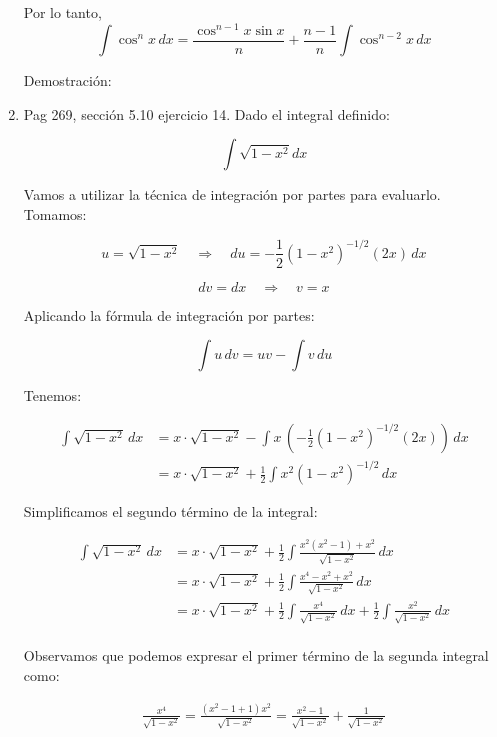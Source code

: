 \documentclass{report}
\begin{document}
\begin{enumerate}
        Por lo tanto,
        \[
        \int \cos^{n} x \, dx = \frac{\cos^{n-1} x \sin x}{n}+\frac{n-1}{n} \int \cos^{n-2} x \, dx
        \]
        
        Demostración:
        
        \item Pag 269, sección 5.10 ejercicio 14. Dado el integral definido:
        
        \[
        \int \sqrt{1-x^{2}} d x
        \]
        
        Vamos a utilizar la técnica de integración por partes para evaluarlo. Tomamos:
        
        \[
        u = \sqrt{1-x^{2}} \quad \Rightarrow \quad du = -\frac{1}{2}(1-x^2)^{-1/2}(2x) \, dx
        \]
        
        \[
        dv = dx \quad \Rightarrow \quad v = x
        \]
        
        Aplicando la fórmula de integración por partes:
        
        \[
        \int u \, dv = uv - \int v \, du
        \]
        
        Tenemos:
        
        \[
        \begin{aligned}
        \int \sqrt{1-x^2} \, dx &= x \cdot \sqrt{1-x^2} - \int x \, \left(-\frac{1}{2}(1-x^2)^{-1/2}(2x)\right) \, dx \\
        &= x \cdot \sqrt{1-x^2} + \frac{1}{2} \int x^2 (1-x^2)^{-1/2} \, dx
        \end{aligned}
        \]
        
        Simplificamos el segundo término de la integral:
        
        \[
        \begin{aligned}
        \int \sqrt{1-x^2} \, dx &= x \cdot \sqrt{1-x^2} + \frac{1}{2} \int \frac{x^2(x^2-1)+x^2}{\sqrt{1-x^2}} \, dx \\
        &= x \cdot \sqrt{1-x^2} + \frac{1}{2} \int \frac{x^4-x^2+x^2}{\sqrt{1-x^2}} \, dx \\
        &= x \cdot \sqrt{1-x^2} + \frac{1}{2} \int \frac{x^4}{\sqrt{1-x^2}} \, dx + \frac{1}{2} \int \frac{x^2}{\sqrt{1-x^2}} \, dx \\
        \end{aligned}
        \]
        
        Observamos que podemos expresar el primer término de la segunda integral como:
        
        \[
        \begin{aligned}
        \frac{x^4}{\sqrt{1-x^2}} = \frac{(x^2-1+1)x^2}{\sqrt{1-x^2}} = \frac{x^2-1}{\sqrt{1-x^2}} + \frac{1}{\sqrt{1-x^2}}
        \end{aligned}
        \]
        

\end{enumerate}
\end{document}
